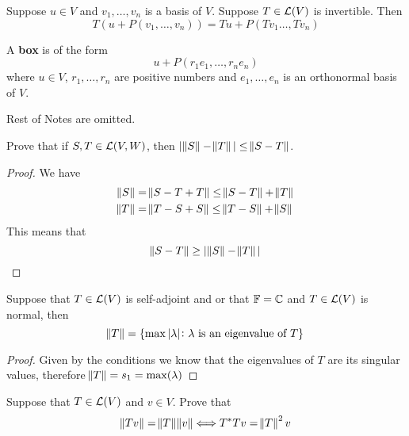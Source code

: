 \documentclass{extarticle}
\begin{document}
\begin{proposition}
    Suppose \(u \in V\) and \(v_1, \ldots, v_n \) is a basis of \(V\). Suppose 
    \(T \in \mathcal{L}(V)\) is invertible. Then 
    \[T(u + P(v_1, \ldots, v_n)) = Tu + P(Tv_1 \ldots, Tv_n)\]
\end{proposition}

\begin{definition}[box]
    A \textbf{box} is of the form 
    \[u + P(r_1 e_1, \ldots, r_n e_n)\]
    where \(u \in V\), \(r_1, \ldots, r_n\) are positive numbers and 
    \(e_1, \ldots, e_n\) is an orthonormal basis of \(V\). 
\end{definition}

Rest of Notes are omitted. 


\newpage 
{}

\begin{problem}{1}
    Prove that if \(S, T \in \mathcal{L}(V, W)\), then 
    \(|\norm{S} - \norm{T}| \leq \norm{S - T}\).
\end{problem}

\begin{proof}
We have 
\begin{align*}
    \norm{S} &= \norm{S - T + T} \leq \norm{S - T} + \norm{T} \\ 
    \norm{T} &= \norm{T - S + S} \leq \norm{T - S} + \norm{S}
\end{align*}
This means that 
\[\norm{S - T} \geq |\norm{S} - \norm{T}|\]
\end{proof}

\begin{problem}{2}
    Suppose that \(T \in \mathcal{L}(V)\) is self-adjoint and 
    or that \(\mathbb{F} = \mathbb{C}\) and \(T \in \mathcal{L}(V)\) is normal, then 
    \[\norm{T} = \{\max |\lambda| \colon \lambda 
    \text{ is an eigenvalue of } T\}\]
\end{problem}

\begin{proof}
Given by the conditions we know that the eigenvalues of 
\(T\) are its singular values, therefore 
\(\norm{T} = s_1 = \max(\lambda)\)
\end{proof}

\begin{problem}{3}
    Suppose that \(T \in \mathcal{L}(V)\) and \(v \in V\). Prove that 
    \[\norm{Tv} = \norm{T} \norm{v} \Longleftrightarrow 
    T^* T v = \norm{T}^2 v\]
\end{problem}
\end{document}
